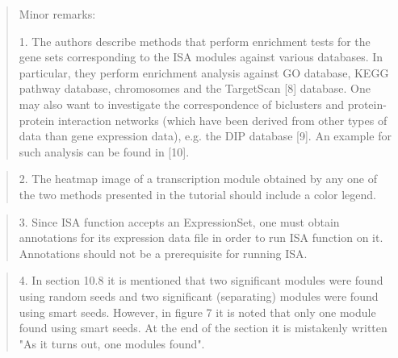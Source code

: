 \documentclass[a4paper]{article}
\begin{document}
\begin{quote}
Minor remarks:

1.      The authors describe methods that perform enrichment tests for
the gene sets corresponding to the ISA modules against various
databases. In particular, they perform enrichment analysis against GO
database, KEGG pathway database, chromosomes and the TargetScan [8]
database. One may also want to investigate the correspondence of
biclusters and protein-protein interaction networks (which have been
derived from other types of data than gene expression data), e.g. the
DIP database [9]. An example for such analysis can be found in [10]. 
\end{quote}

\begin{quote}
2.      The heatmap image of a transcription module obtained by any
one of the two methods presented in the tutorial should include a
color legend. 
\end{quote}

\begin{quote}
3.      Since ISA function accepts an ExpressionSet, one must obtain
annotations for its expression data file in order to run ISA function
on it. Annotations should not be a prerequisite for running ISA. 
\end{quote}

\begin{quote}
4.      In section 10.8 it is mentioned that two significant modules
were found using random seeds and two significant (separating) modules
were found using smart seeds. However, in figure 7 it is noted that
only one module found using smart seeds. At the end of the section it
is mistakenly written "As it turns out, one modules found". 
\end{quote}
\end{document}
